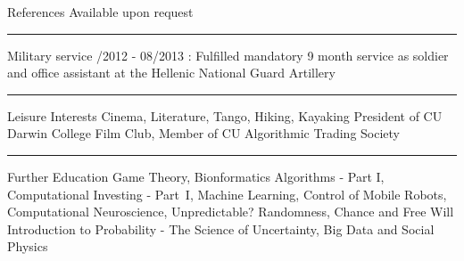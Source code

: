 \documentclass[11pt]{resume}
\begin{document}
\begin{category}{References} 
\citemnobullet Available upon request

\noindent\rule{\textwidth}{0.2pt}
%
%
%    
\end{category}



\begin{category}{Military service} 
/2012 - 08/2013 : Fulfilled mandatory 9 month service as soldier and office assistant at the Hellenic National Guard Artillery  

\noindent\rule{\textwidth}{0.2pt}
\end{category}


\begin{category}{Leisure Interests}
\citemnobullet Cinema, Literature, Tango, Hiking, Kayaking
\citemnobullet President of CU Darwin College Film Club, Member of CU Algorithmic Trading Society %

\noindent\rule{\textwidth}{0.2pt}
\end{category}


\begin{category}{Further Education}
Game Theory,
Bionformatics Algorithms - Part I, Computational Investing - \mbox{Part I},
Machine Learning, Control of Mobile Robots,
Computational Neuroscience, Unpredictable? Randomness, Chance and Free Will
Introduction to Probability - The Science of Uncertainty,
Big Data and Social Physics
\end{category}
\end{document}
